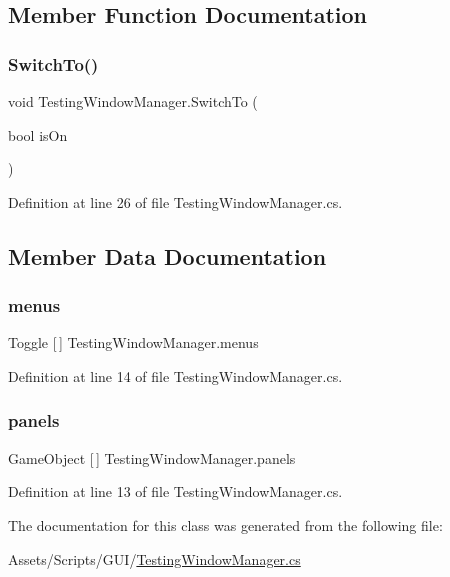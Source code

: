 \subsection{Member Function Documentation}
\mbox{\label{class_testing_window_manager_ac1405389a3ba1b9e8b2d47893ea546f0}} 
\subsubsection{\texorpdfstring{Switch\+To()}{SwitchTo()}}
{\footnotesize\ttfamily void Testing\+Window\+Manager.\+Switch\+To (\begin{DoxyParamCaption}\item[{bool}]{is\+On }\end{DoxyParamCaption})}



Definition at line 26 of file Testing\+Window\+Manager.\+cs.



\subsection{Member Data Documentation}
\mbox{\label{class_testing_window_manager_a168a9b08d5b0bae7dac1bc68fc5a4380}} 
\subsubsection{\texorpdfstring{menus}{menus}}
{\footnotesize\ttfamily Toggle \mbox{[}$\,$\mbox{]} Testing\+Window\+Manager.\+menus}



Definition at line 14 of file Testing\+Window\+Manager.\+cs.

\mbox{\label{class_testing_window_manager_aebb909cfdead55f755680e0e409e1974}} 
\subsubsection{\texorpdfstring{panels}{panels}}
{\footnotesize\ttfamily Game\+Object \mbox{[}$\,$\mbox{]} Testing\+Window\+Manager.\+panels}



Definition at line 13 of file Testing\+Window\+Manager.\+cs.



The documentation for this class was generated from the following file\+:\begin{DoxyCompactItemize}
\item 
Assets/\+Scripts/\+G\+U\+I/\mbox{\hyperlink{_testing_window_manager_8cs}{Testing\+Window\+Manager.\+cs}}\end{DoxyCompactItemize}
